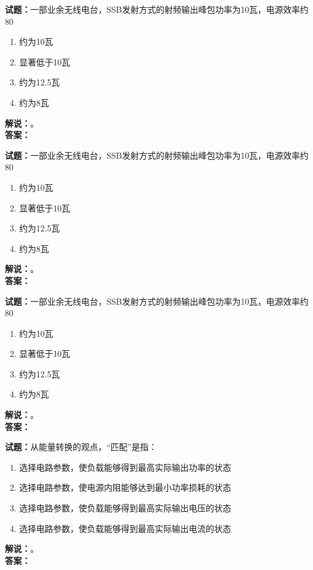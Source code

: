 \documentclass{ctexbook}
\begin{document}
\noindent\textbf{试题：}一部业余无线电台，SSB发射方式的射频输出峰包功率为10瓦，电源效率约80%
\begin{enumerate}[leftmargin=3em]
\item 约为10瓦
\item 显著低于10瓦
\item 约为12.5瓦
\item 约为8瓦
\end{enumerate}
\noindent\textbf{解说：}\textbf{}。\\\noindent\textbf{答案：}

\bigskip




\noindent\textbf{试题：}一部业余无线电台，SSB发射方式的射频输出峰包功率为10瓦，电源效率约80%
\begin{enumerate}[leftmargin=3em]
\item 约为10瓦
\item 显著低于10瓦
\item 约为12.5瓦
\item 约为8瓦
\end{enumerate}
\noindent\textbf{解说：}\textbf{}。\\\noindent\textbf{答案：}

\bigskip




\noindent\textbf{试题：}一部业余无线电台，SSB发射方式的射频输出峰包功率为10瓦，电源效率约80%
\begin{enumerate}[leftmargin=3em]
\item 约为10瓦
\item 显著低于10瓦
\item 约为12.5瓦
\item 约为8瓦
\end{enumerate}
\noindent\textbf{解说：}\textbf{}。\\\noindent\textbf{答案：}

\bigskip




\noindent\textbf{试题：}从能量转换的观点，“匹配”是指：
\begin{enumerate}[leftmargin=3em]
\item 选择电路参数，使负载能够得到最高实际输出功率的状态
\item 选择电路参数，使电源内阻能够达到最小功率损耗的状态
\item 选择电路参数，使负载能够得到最高实际输出电压的状态
\item 选择电路参数，使负载能够得到最高实际输出电流的状态
\end{enumerate}
\noindent\textbf{解说：}\textbf{}。\\\noindent\textbf{答案：}
\end{document}
